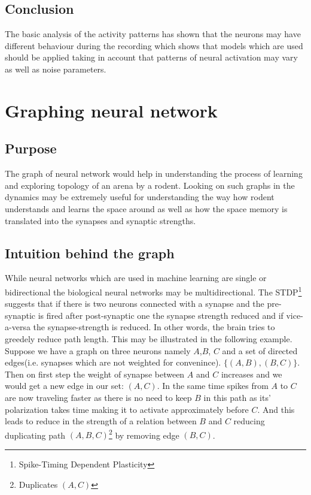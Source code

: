 \documentclass{article}
\begin{document}
	\subsection{Conclusion}\label{subsec:conclusion}
	The basic analysis of the activity patterns has shown that the neurons may have different behaviour during the recording
	which shows that models which are used should be applied taking in account that patterns of neural activation may vary
	as well as noise parameters.
	\section{Graphing neural network}\label{sec:graphing-neural-network}

	\subsection{Purpose}\label{subsec:purpose}
	The graph of neural network would help in understanding the process of learning and exploring topology of an arena by
	a rodent. Looking on such graphs in the dynamics may be extremely useful for understanding the way how rodent understands
	and learns the space around as well as how the space memory is translated into the synapses and synaptic strengths.
	\subsection{Intuition behind the graph}\label{subsec:intuition-behind-the-graph}
	While neural networks which are used in machine learning are single or bidirectional the biological neural networks
	may be multidirectional. The STDP\footnote{Spike-Timing Dependent Plasticity} suggests that if there is two neurons
	connected with a synapse and the pre-synaptic is fired after post-synaptic one the synapse strength reduced
	and if vice-a-versa the synapse-strength is reduced. In other words, the brain tries to greedely reduce path length.
	This may be illustrated in the following example. Suppose we have a graph on three neurons namely $A$,$B$, $C$ and a
	set of directed edges(i.e. synapses which are not weighted for convenince). $\{(A,B), (B,C)\}$. Then on first step the
	weight of synapse between $A$ and $C$ increases and we would get a new edge in our set: $(A,C)$. In the same time
	spikes from $A$ to $C$ are now traveling faster as there is no need to keep $B$ in this path as its' polarization
	takes time making it to activate approximately before $C$.
	And this leads to reduce in the strength of a relation
	between $B$ and $C$ reducing duplicating path $(A,B,C)$\footnote{Duplicates $(A,C)$} by removing edge $(B,C)$.
\end{document}
